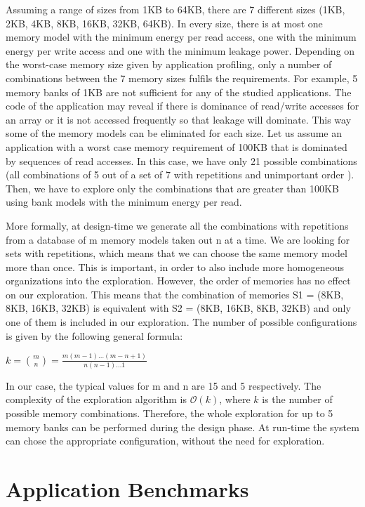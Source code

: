 Assuming a range of sizes from 1KB to 64KB, there are 7 different sizes (1KB, 2KB, 4KB, 8KB, 16KB, 32KB, 64KB). 
In every size, there is at most one memory model with the minimum energy per read access, one with the minimum energy per write access and one with the minimum leakage power. 
Depending on the worst-case memory size given by application profiling, only a number of combinations between the 7 memory sizes fulfils the requirements. 
For example, 5 memory banks of 1KB are not sufficient for any of the studied applications. The code of the application may reveal if there is dominance of read/write accesses for an array or it is not accessed frequently so that leakage will dominate. 
This way some of the memory models can be eliminated for each size. 
Let us assume an application with a worst case memory requirement of 100KB that is dominated by sequences of read accesses. 
In this case, we have only 21 possible combinations (all combinations of 5 out of a set of 7 with repetitions and unimportant order \cite{Math}). 
Then, we have to explore only the combinations that are greater than 100KB using bank models with the minimum energy per read. 

More formally, at design-time we generate all the combinations with repetitions from a database of m memory models taken out n at a time. 
We are looking for sets with repetitions, which means that we can choose the same memory model more than once. 
This is important, in order to also include more homogeneous organizations into the exploration. 
However, the order of memories has no effect on our exploration. 
This means that the combination of memories S1 = (8KB, 8KB, 16KB, 32KB) is equivalent with S2 = (8KB, 16KB, 8KB, 32KB) and only one of them is included in our exploration. 
The number of possible configurations is given by the following general formula:
\begin{center}
$ k = \binom mn = \frac{m(m-1)\ldots(m-n+1)}{n(n-1)\dots1} $
\end{center} 

In our case, the typical values for m and n are 15 and 5 respectively. 
The complexity of the exploration algorithm is $\mathcal{O} (k)$, where $k$ is the number of possible memory combinations. 
Therefore, the whole exploration for up to 5 memory banks can be performed during the design phase. At run-time the system can chose the appropriate configuration, without the need for exploration.
 
\section{Application Benchmarks}
\label{sec:applicationsC}

